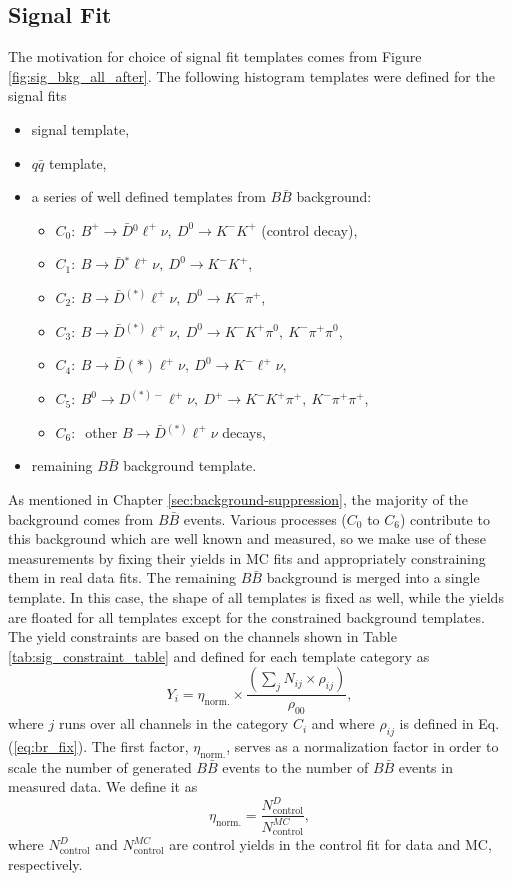 \subsection{Signal Fit}\label{sec:templates-in-signal-fits}
The motivation for choice of signal fit templates comes from Figure \ref{fig:sig_bkg_all_after}. The following histogram templates were defined for the signal fits
\begin{itemize}
\item signal template,
\item $q \bar q$ template,
\item a series of well defined templates from $B \bar B$ background:
\begin{itemize}
	\item $C_0:~B^+ \to \bar{D} {}^0 \ell^+ \nu,~D^0 \to K^-K^+$ (control decay),
	\item $C_1:~B \to \bar{D} {}^* \ell^+ \nu,~D^0 \to K^-K^+$,
	\item $C_2:~B \to \bar{D} {}^{(*)} \ell^+ \nu,~D^0 \to K^-\pi^+$,
	\item $C_3:~B \to \bar{D} {}^{(*)} \ell^+ \nu,~D^0 \to K^-K^+\pi^0,~K^-\pi^+\pi^0$,
	\item $C_4:~B \to \bar{D} {}{(*)} \ell^+ \nu,~D^0 \to K^-\ell^+\nu$,
	\item $C_5:~B^0 \to D^{(*)-} \ell^+ \nu,~D^+ \to K^-K^+\pi^+,~K^-\pi^+\pi^+$,
	\item $C_6:~$ other $B \to \bar D {}^{(*)} \ell^+ \nu$ decays,
\end{itemize}
\item remaining $B \bar B$ background template.
\end{itemize}
As mentioned in Chapter \ref{sec:background-suppression}, the majority of the background comes from $B \bar B$ events. Various processes ($C_0$ to $C_6$) contribute to this background which are well known and measured, so we make use of these measurements by fixing their yields in MC fits and appropriately constraining them in real data fits. The remaining $B \bar B$ background is merged into a single template. In this case, the shape of all templates is fixed as well, while the yields are floated for all templates except for the constrained background templates. The yield constraints are based on the channels shown in Table \ref{tab:sig_constraint_table} and defined for each template category as 
\begin{equation}
Y_i = \eta_{\mathrm{norm.}} \times \frac{\left(\sum_j N_{ij}\times \rho_{ij} \right)}{\rho_{00}},
\label{eq:sig_fix}
\end{equation}
where $j$ runs over all channels in the category $C_i$ and where $\rho_{ij}$ is defined in Eq. (\ref{eq:br_fix}). The first factor, $\eta_{\mathrm{norm.}}$, serves as a normalization factor in order to scale the number of generated $B \bar B$ events to the number of $B \bar B$ events in measured data. We define it as
\begin{equation}
\eta_{\mathrm{norm.}} = \frac{N_{\mathrm{control}}^D}{N_{\mathrm{control}}^{MC}},
\end{equation}
where $N_{\mathrm{control}}^D$ and $N_{\mathrm{control}}^{MC}$ are control yields in the control fit for data and MC, respectively.


